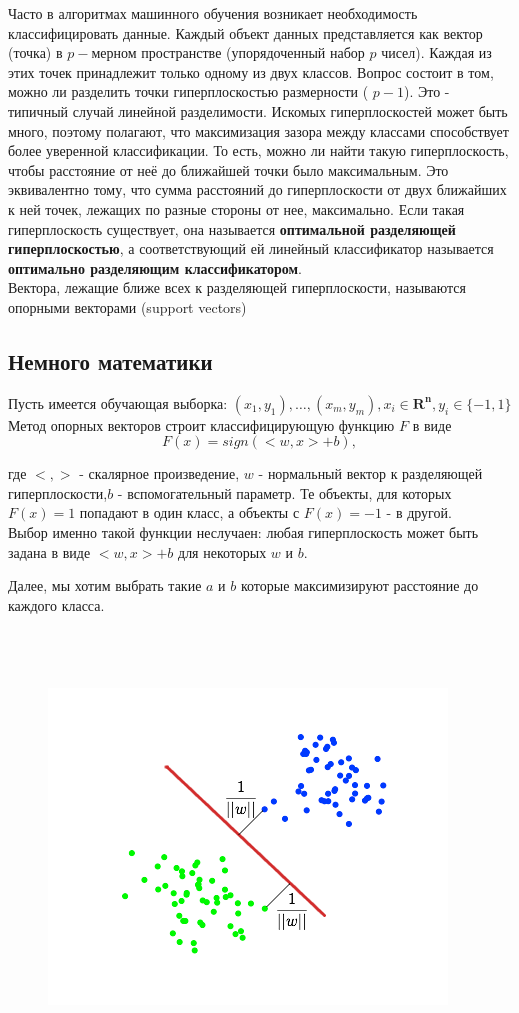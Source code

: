 \documentclass[paper=a4, fontsize=11pt]{scrartcl} %
\numberwithin{equation}{section} %
\numberwithin{figure}{section} %
\numberwithin{table}{section} %
\begin{document}
	Часто в алгоритмах машинного обучения возникает необходимость классифицировать данные. Каждый объект данных представляется как вектор (точка) в $p-$мерном пространстве (упорядоченный набор $p$ чисел). Каждая из этих точек принадлежит только одному из двух классов. Вопрос состоит в том, можно ли разделить точки гиперплоскостью размерности ( $p-1$). Это - типичный случай линейной разделимости. Искомых гиперплоскостей может быть много, поэтому полагают, что максимизация зазора между классами способствует более уверенной классификации. То есть, можно ли найти такую гиперплоскость, чтобы расстояние от неё до ближайшей точки было максимальным. Это эквивалентно тому, что сумма расстояний до гиперплоскости от двух ближайших к ней точек, лежащих по разные стороны от нее, максимально. Если такая гиперплоскость существует, она называется \textbf{оптимальной разделяющей гиперплоскостью}, а соответствующий ей линейный классификатор называется \textbf{оптимально разделяющим классификатором}. \\
	Вектора, лежащие ближе всех к разделяющей гиперплоскости, называются опорными векторами (support vectors)
	
	\subsection{Немного математики}
	
	Пусть имеется обучающая выборка: $(x_1,y_1),\ldots,(x_m,y_m), x_i \in \mathbf{R^n}, y_i \in \{-1,1\}$
	Метод опорных векторов строит классифицирующую функцию $F$ в виде $$F(x) = sign(<w,x>+b),$$
	
	где $<,>$ - скалярное произведение, $w$ - нормальный вектор к разделяющей гиперплоскости,$b$ - вспомогательный параметр. Те объекты, для которых $F(x) = 1$ попадают в один класс, а объекты с $F(x) = -1$ - в другой.\\
	Выбор именно такой функции неслучаен: любая гиперплоскость может быть задана в виде $<w,x>+b$ для некоторых $w$ и $b$.
	
	Далее, мы хотим выбрать такие $a$ и $b$ которые максимизируют расстояние до каждого класса. 
	\\
	\\
	\\
	\\
	\begin{figure}[h!]
		\centering
		\includegraphics[scale=0.75]{svm}
	\end{figure}
	
\end{document}
